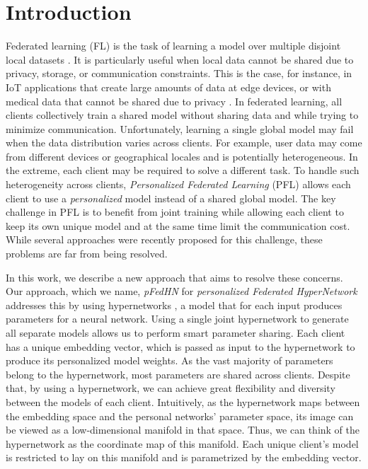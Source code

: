 \documentclass{article}
\newcommand\ourmethod{pFedHN}
\begin{document}
\section{Introduction}
\label{intro}
Federated learning (FL) is the task of learning a model over multiple disjoint local datasets \cite{McMahan2017CommunicationEfficientLO, Yang2019FederatedML}. It is particularly useful when local data cannot be shared due to privacy, storage, or communication constraints. This is the case, for instance, in IoT applications that create large amounts of data at edge devices, or with medical data that cannot be shared due to privacy \citep{Wu2020PersonalizedFL}. In federated learning, all clients collectively train a shared model without sharing data and while trying to minimize communication.
Unfortunately, learning a single global model may fail when the data distribution varies across clients. For example, user data may come from different devices or geographical locales and is potentially heterogeneous. In the extreme, each client may be required to solve a different task. To handle such heterogeneity across clients, \textit{Personalized Federated Learning} (PFL) \cite{smith2017federated} allows each client to use a \textit{personalized} model instead of a shared global model. The key challenge in PFL is to benefit from joint training while allowing each client to keep its own unique model and at the same time limit the communication cost. While several approaches were recently proposed for this challenge, these problems are far from being resolved.  

In this work, we describe a new approach that aims to resolve these concerns. Our approach, which we name, \textit{\ourmethod{}} for \textit{personalized Federated HyperNetwork} addresses this by using hypernetworks \cite{Ha2017HyperNetworks}, a model that for each input produces parameters for a neural network. Using a single joint hypernetwork to generate all separate models allows us to perform smart parameter sharing. Each client has a unique embedding vector, which is passed as input to the hypernetwork to produce its personalized model weights. As the vast majority of parameters belong to the hypernetwork, most parameters are shared across clients. Despite that, by using a hypernetwork, we can achieve great flexibility and diversity between the models of each client. Intuitively, as the hypernetwork maps between the embedding space and the personal networks' parameter space, its image can be viewed as a low-dimensional manifold in that space. Thus, we can think of the hypernetwork as the coordinate map of this manifold. Each unique client's model is restricted to lay on this manifold and is parametrized by the embedding vector.
\end{document}
